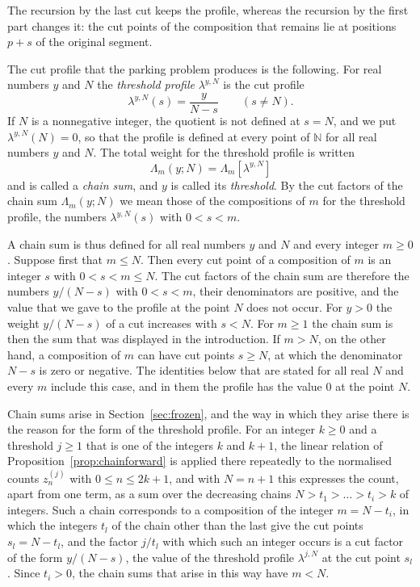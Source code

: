 \documentclass{amsart}
\theoremstyle{definition}
\theoremstyle{remark}
\numberwithin{equation}{section}
\begin{document}
The recursion by the last cut keeps the
profile, whereas the recursion by the first part changes it: the cut points
of the composition that remains lie at positions $p+s$ of the original
segment.

The cut profile that the parking problem produces is the following. For real
numbers $y$ and $N$ the \emph{threshold profile} $\lambda^{y,N}$ is the cut
profile
\[
\lambda^{y,N}(s)=\frac{y}{N-s}\qquad(s\ne N).
\]
If $N$ is a nonnegative integer, the quotient is not defined at $s=N$, and
we put $\lambda^{y,N}(N)=0$, so that the profile is defined at every point
of $\mathbb N$ for all real numbers $y$ and $N$. The total weight for the
threshold profile is written
\[
\Lambda_m(y;N)=\Lambda_m[\lambda^{y,N}]
\]
and is called a \emph{chain sum}, and $y$ is called its \emph{threshold}.
By the cut factors of the chain sum $\Lambda_m(y;N)$ we mean those of the
compositions of $m$ for the threshold profile, the numbers
$\lambda^{y,N}(s)$ with $0<s<m$.

A chain sum is thus defined for all real numbers $y$ and $N$ and every
integer $m\ge0$. Suppose first that $m\le N$. Then every cut point of a
composition of $m$ is an integer $s$ with $0<s<m\le N$.
The cut factors of the chain sum are therefore the numbers
$y/(N-s)$ with $0<s<m$, their denominators are positive, and the value that
we gave to the profile at the point $N$ does not occur. For $y>0$ the weight
$y/(N-s)$ of a cut increases with $s<N$. For $m\ge1$ the chain sum is then
the sum that was displayed in the introduction.
If $m>N$, on the other hand, a composition of $m$ can have cut
points $s\ge N$, at which the denominator $N-s$ is zero or negative. The
identities below that are stated for all real $N$ and every $m$ include this
case, and in them the profile has the value $0$ at the point $N$.

Chain sums arise in Section~\ref{sec:frozen}, and the way in which they
arise there is the reason for the form of the threshold profile. For an
integer $k\ge0$ and a threshold $j\ge1$ that is one of the integers $k$ and
$k+1$, the linear relation of Proposition~\ref{prop:chainforward} is applied
there repeatedly to the normalised counts $z^{(j)}_n$ with $0\le n\le2k+1$,
and with $N=n+1$ this expresses the count, apart from one term, as a sum
over the decreasing chains $N>t_1>\dots>t_i>k$ of integers. Such a chain
corresponds to a composition of the integer $m=N-t_i$, in which the integers
$t_l$ of the chain other than the last give the cut points $s_l=N-t_l$, and
the factor $j/t_l$ with which such an integer occurs is a cut factor of the
form $y/(N-s)$, the value of the threshold profile $\lambda^{j,N}$ at the
cut point $s_l$. Since $t_i>0$, the chain sums that arise in this way have
$m<N$.
\end{document}
